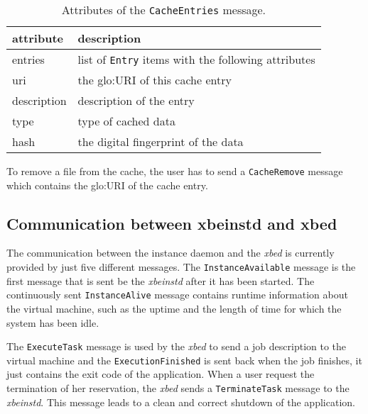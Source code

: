 \begin{table}[ht]
  \centering
  \begin{tabular}{@{}lp{}@{}}\toprule
    attribute        & \multicolumn{1}{l}{description} \\ \midrule %
    entries          & list of \texttt{Entry} items with the following attributes \\
    uri              & the \gls{glo:URI} of this cache entry \\
    description      & description of the entry \\
    type             & type of cached data \\
    hash             & the digital fingerprint of the data \\
    \bottomrule
  \end{tabular}
  \caption{Attributes of the \texttt{CacheEntries} message.}
  \label{tab:msg:cache-entries}
\end{table}

To   remove  a   file  from   the   cache,  the   user  has   to  send   a
\texttt{CacheRemove} message which contains the \gls{glo:URI} of the cache
entry.
 
\subsection{Communication between xbeinstd and xbed}

The  communication between  the  instance daemon  and  the \emph{xbed}  is
currently    provided   by    just   five    different    messages.    The
\texttt{InstanceAvailable} message  is the first  message that is  sent be
the  \emph{xbeinstd} after  it has  been started.   The  continuously sent
\texttt{InstanceAlive}  message  contains  runtime information  about  the
virtual machine, such  as the uptime and the length of  time for which the
system has been idle.

The \texttt{ExecuteTask} message is used  by the \emph{xbed} to send a job
description to  the virtual machine and  the \texttt{ExecutionFinished} is
sent back  when the job  finishes, it just  contains the exit code  of the
application. When a user request  the termination of her reservation, the
\emph{xbed}    sends    a    \texttt{TerminateTask}   message    to    the
\emph{xbeinstd}. This message leads to a clean and correct shutdown of the
application.



